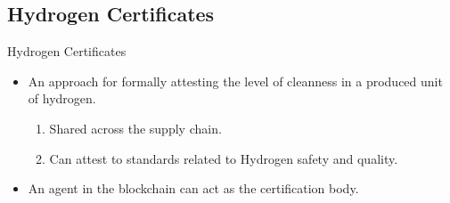 \subsection{Hydrogen Certificates}
\begin{frame}{Hydrogen Certificates}
    \begin{itemize}
        \item An approach for formally attesting the level of cleanness in
              a produced unit of hydrogen.
              \begin{enumerate}
                  \item Shared across the supply chain.
                  \item Can attest to standards related to Hydrogen
                        safety and quality.
              \end{enumerate}
        \item An agent in the blockchain can act as the certification body.
    \end{itemize}
\end{frame}
